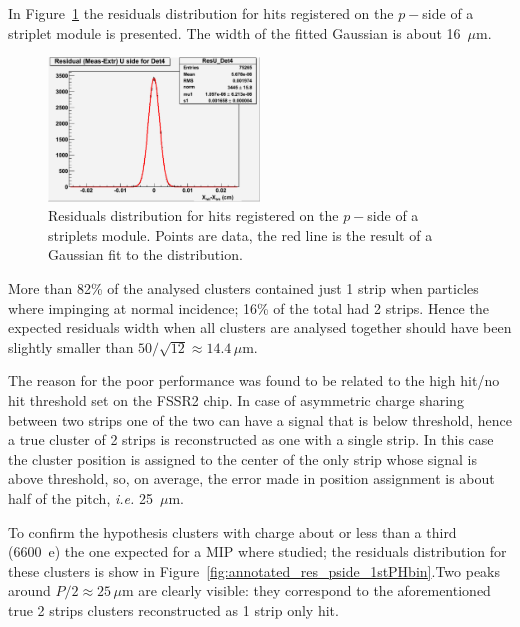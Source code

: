 In Figure~\ref{fig:res_pside} the residuals distribution for hits registered on the $p-$side of a striplet 
module is presented. The width of the fitted Gaussian is about 16~$\mu$m.

\begin{figure}[!htpb]
\centering
\includegraphics[width=0.5\textwidth]{res_pisde.pdf}
\caption{\label{fig:res_pside}Residuals distribution for hits registered on the $p-$side of a 
striplets module. Points are data, the red line is the result of a Gaussian fit to the distribution.}
\end{figure}

More than 82\% of the analysed clusters contained just 1 strip when particles where impinging 
at normal incidence; 16\% of the total had 2 strips. Hence the expected residuals width when all 
clusters are analysed together should have been slightly smaller than 
$50/\sqrt{12}\approx 14.4\, \mu$m. 

The reason for the poor performance was found to be related to the high hit/no hit threshold set 
on the FSSR2 chip. In case of asymmetric charge sharing between two strips one of the two 
can have a signal that is below threshold, hence a true cluster of 2 strips is reconstructed as one with 
 a single strip. In this case the cluster position is assigned to the center of the only strip whose signal is 
above threshold, so, on average, the error made in position assignment is about half of the pitch, 
{\it i.e.} 25~$\mu$m.

To confirm the hypothesis clusters with charge about or less than
 a third (6600~e) the one expected for a MIP where 
studied; the residuals distribution for these clusters is show in 
Figure~\ref{fig:annotated_res_pside_1stPHbin}.Two peaks around $P/2\approx25\,\mu$m are clearly visible: they correspond to the aforementioned true 2 strips clusters reconstructed as 1 strip only 
hit.


